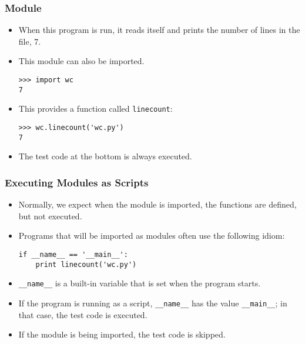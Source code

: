 \documentclass[handout]{beamer}
\newcommand{\beforeverb}{\footnotesize}
\newcommand{\afterverb}{\normalsize}
\begin{document}
\begin{frame}[fragile]
\frametitle{Module}
\begin{itemize}
\item When this program is run, it reads itself and prints the number
of lines in the file, 7.

\item This module can also be imported.
\beforeverb
\begin{verbatim}
>>> import wc
7
\end{verbatim}
\afterverb
\item
This  provides a function called \verb"linecount":

\beforeverb
\begin{verbatim}
>>> wc.linecount('wc.py')
7
\end{verbatim}
\afterverb
%
\item 
The test code at the bottom is always executed. 
\end{itemize}
\end{frame}


\begin{frame}[fragile]
\frametitle{Executing Modules as Scripts}
\begin{itemize}
\item Normally, we expect when the module is \alert{imported}, the functions are \alert{defined}, but not \alert{executed}.
\item  Programs that will be imported as modules often use the following idiom:
\beforeverb
\begin{verbatim}
if __name__ == '__main__':
    print linecount('wc.py')
\end{verbatim}
\afterverb
%
\item 
\verb"__name__" is a built-in variable that is set when the
program starts.  
\item If the program is running as a script,
\verb"__name__" has the value \verb"__main__"; in that
case, the test code is executed.  
\item If the module is being imported, the test code is skipped.
\end{itemize}
\end{frame}
\end{document}
